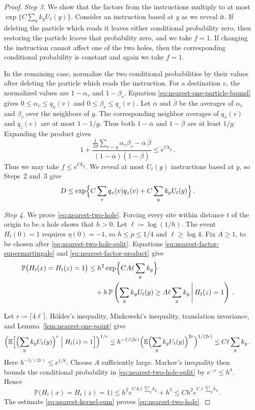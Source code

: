 \documentclass[11pt]{amsart}
\theoremstyle{plain}
\theoremstyle{definition}
\newcommand{\E}{\mathbb{E}}
\renewcommand{\P}{\mathbb{P}}
\begin{document}
\begin{proof}
	\smallskip
	\noindent\emph{Step 3.} We show that the factors from the instructions
	multiply to at most $\exp\{C\sum_yk_yU_t(y)\}$. Consider
	an instruction based at $y$ as we reveal it. If deleting the particle
	which reads it leaves either conditional probability zero, then restoring the
	particle leaves that probability zero, and we take $f=1$. If changing the
	instruction cannot affect one of the two holes, then the corresponding
	conditional probability is constant and again we take $f=1$.

	In the remaining case, normalize the two conditional probabilities by their
	values after deleting the particle which reads the instruction. For a destination $v$, the
	normalized values are $1-\alpha_v$ and $1-\beta_v$.
	Equation \eqref{eq:nearest-one-particle-bound} gives $0\leq\alpha_v\leq q_x(v)$ and
	$0\leq\beta_v\leq q_z(v)$. Let $\overline\alpha$ and $\overline\beta$ be
	the averages of $\alpha_v$ and $\beta_v$ over the neighbors of $y$. The
	corresponding neighbor averages of $q_x(v)$ and $q_z(v)$ are at most
	$1-1/g$. Thus both $1-\overline\alpha$ and $1-\overline\beta$ are at least
	$1/g$. Expanding the product gives
	\[
		1+\frac{\frac1{2d}\sum_{v\sim y}\alpha_v\beta_v
		-\overline\alpha\,\overline\beta}
		{(1-\overline\alpha)(1-\overline\beta)}
		\leq e^{Ck_y}\,.
	\]
	Thus we may take $f\leq e^{Ck_y}$. We reveal at most $U_t(y)$ instructions
	based at $y$, so Steps~2 and~3 give
	\begin{equation}\label{eq:nearest-factor-product}
		D\leq
		\exp\Bigl\{C\sum_vq_x(v)q_z(v)+C\sum_yk_yU_t(y)\Bigr\}\,.
	\end{equation}

	\smallskip
	\noindent\emph{Step 4.} We prove \eqref{eq:nearest-two-hole}. Forcing every site within
	distance $t$ of the origin to be a hole shows that $h>0$. Let
	$\ell\coloneqq\log(1/h)$. The event $H_t(0)=1$ requires $\eta(0)=-1$, so
	$h\leq p\leq1/4$ and $\ell\geq\log4$. Fix $A\geq1$, to be chosen after
	\eqref{eq:nearest-two-hole-split}. Equations
	\eqref{eq:nearest-factor-supermartingale}
	and \eqref{eq:nearest-factor-product} give
	\begin{align}
		\P\bigl(H_t(x)=H_t(z)=1\bigr)
		&\leq h^2\exp\Bigl\{CA\ell\sum_yk_y\Bigr\}\notag\\
		&\quad+h\,\P\left(
			\sum_yk_yU_t(y)\geq A\ell\sum_yk_y
			\,\middle|\,H_t(z)=1\right)\,.
		\label{eq:nearest-two-hole-split}
	\end{align}

	Let $r\coloneqq\lceil4\ell\rceil$. H\"older's inequality, Minkowski's
	inequality, translation invariance, and
	Lemma~\ref{lem:nearest-one-point} give
	\[
		\Bigl(\E\Bigl[\Bigl(\sum_yk_yU_t(y)\Bigr)^r
		\Bigm|H_t(z)=1\Bigr]\Bigr)^{1/r}
		\leq h^{-1/(2r)}
		\Bigl(\E\Bigl(\sum_yk_yU_t(y)\Bigr)^{2r}\Bigr)^{1/(2r)}
		\leq C\ell\sum_yk_y\,.
	\]
	Here $h^{-1/(2r)}\leq e^{1/8}$. Choose $A$ sufficiently large. Markov's
	inequality then bounds the conditional probability in
	\eqref{eq:nearest-two-hole-split} by $e^{-r}\leq h^4$. Hence
	\[
		\P\bigl(H_t(x)=H_t(z)=1\bigr)
		\leq h^2e^{CA\ell\sum_yk_y}+h^5
		\leq Ch^2e^{C\ell\sum_yk_y}\,.
	\]
	The estimate \eqref{eq:nearest-kernel-sum} proves
	\eqref{eq:nearest-two-hole}.
\end{proof}
\end{document}
